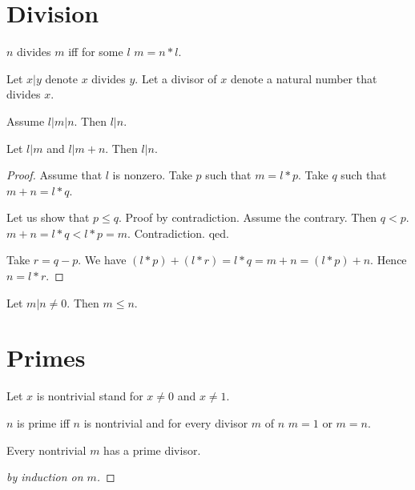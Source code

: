\documentclass[11pt]{article}
\begin{document}
\section{Division}

\begin{forthel}

\begin{definition}
$n$ divides $m$ iff for some $l$ $m = n * l$.
\end{definition}

Let $x | y$ denote $x$ divides $y$.
Let a divisor of $x$ denote a natural number that divides $x$.

\begin{lemma}
Assume $l | m | n$.
Then $l | n$.
\end{lemma}

\begin{lemma}
Let $l | m$ and $l | m + n$.
Then $l | n$.
\end{lemma}
\begin{proof}
Assume that $l$ is nonzero.
Take $p$ such that $m = l * p$.
Take $q$ such that $m + n = l * q$.

Let us show that
$p \leq q$.
Proof by contradiction.
Assume the contrary. Then $q < p$.
$m+n = l * q < l * p = m$.
Contradiction. qed.

Take $r = q - p$.
We have $(l * p) + (l * r) = l * q = m + n = (l * p) + n$.
Hence $n = l * r$.
\end{proof}

\begin{lemma}
Let $m | n \neq 0$.
Then $m \leq n$.
\end{lemma}

\end{forthel}


\section{Primes}

\begin{forthel}

Let $x$ is nontrivial stand for $x \neq 0$ and $x \neq 1$.

\begin{definition}
$n$ is prime iff $n$ is nontrivial and
for every divisor $m$ of $n$ $m = 1$ or $m = n$.
\end{definition}

\begin{lemma}
Every nontrivial $m$ has a prime divisor.
\end{lemma}
\begin{proof}[by induction on $m$]
\end{proof}

\end{forthel}
\end{document}
